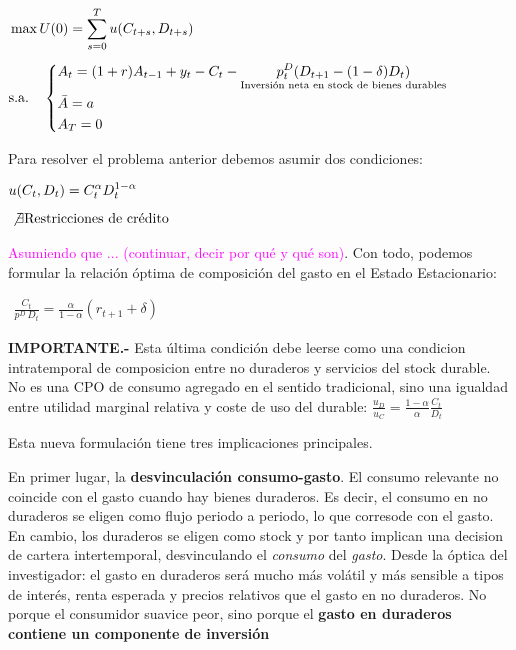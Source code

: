 \documentclass[10pt,a4paper]{article}
\begin{document}
$\begin{aligned}
        &\max U(0)=\sum_{s=0}^Tu(C_{t+s},D_{t+s})\\[0.5em]
        &\text{s.a.}\quad 
        \left\{\begin{aligned}
            &A_t=(1+r)A_{t-1}+y_t-C_t-\underset{\text{\scriptsize Inversión neta en stock de bienes durables}}{p_t^D(D_{t+1}-(1-\delta)D_{t})}\\
            &\bar A=a\\
            &A_T=0
        \end{aligned}\right.
\end{aligned}$

Para resolver el problema anterior debemos asumir dos condiciones:

$\begin{aligned}
  &u(C_t,D_t)=C_t^\alpha D_t^{1-\alpha}\\[0.5em]
  &\not\exists\text{Restricciones de crédito}
\end{aligned}$

\textcolor{magenta}{Asumiendo que ... (continuar, decir por qué y qué son)}. Con todo, podemos formular la relación óptima de composición del gasto en el Estado Estacionario:

$\begin{aligned}
  \frac{C_t}{p^D\,D_t}=\frac{\alpha}{1-\alpha}(r_{t+1}+\delta)
\end{aligned}$

\textbf{IMPORTANTE.-} Esta última condición debe leerse como una condicion intratemporal de composicion entre no duraderos y servicios del stock durable. No es una CPO de consumo agregado en el sentido tradicional, sino una igualdad entre utilidad marginal relativa y coste de uso del durable: $\frac{u_D}{u_C}=\frac{1-\alpha}{\alpha}\frac{C_t}{D_t}$

Esta nueva formulación tiene tres implicaciones principales.

En primer lugar, la \textbf{desvinculación consumo-gasto}. El consumo relevante no coincide con el gasto cuando hay bienes duraderos. Es decir, el consumo en no duraderos se eligen como flujo periodo a periodo, lo que corresode con el gasto. En cambio, los duraderos se eligen como stock y por tanto implican una decision de cartera intertemporal, desvinculando el \textit{consumo} del \textit{gasto}. Desde la óptica del investigador: el gasto en duraderos será mucho más volátil y más sensible a tipos de interés, renta esperada y precios relativos que el gasto en no duraderos. No porque el consumidor suavice peor, sino porque el \textbf{gasto en duraderos contiene un componente de inversión}
\end{document}
